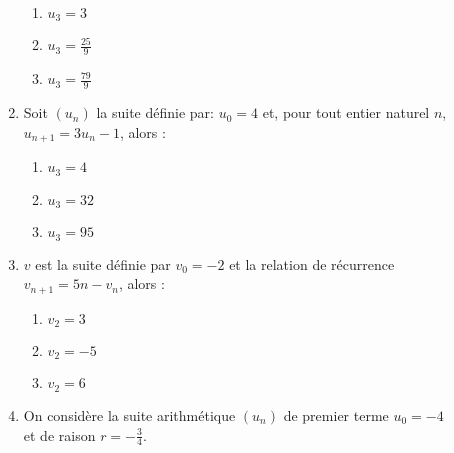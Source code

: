 \documentclass[oneside,twocolumn,landscape]{book}
\begin{document}
\begin{enumerate}
\begin{enumerate}

\item\MauvaiseReponse $u_{3}=3$

\item\BonneReponse $u_{3}=\frac{25}{9}$

\item\MauvaiseReponse $u_{3} =\frac{79}{9}$

\end{enumerate}




\item Soit $\left(u_{n}\right)$ la suite définie par: $u_{0}=4$ et, pour tout entier naturel $n$, $u_{n+1}=3 u_{n}-1$, alors :

\begin{enumerate}

\item\MauvaiseReponse $u_{3}=4$

\item\MauvaiseReponse $u_{3}=32$

\item\BonneReponse $u_{3}=95$

\end{enumerate}

\newpage

\item $v$ est la suite définie par $v_{0}=-2$ et la relation de récurrence\\ $v_{n+1}=5n-v_{n}$, alors :

\begin{enumerate}

\item\BonneReponse $v_{2}=3$

\item\MauvaiseReponse $v_{2}=-5$

\item\MauvaiseReponse $v_{2}=6$

\end{enumerate}







\item On considère la suite arithmétique $\left(u_{n}\right)$ de premier terme $u_{0}=-4$\\ et de raison $r=-\frac{3}{4}$.

\begin{enumerate}


\end{enumerate}
\end{enumerate}
\end{document}
